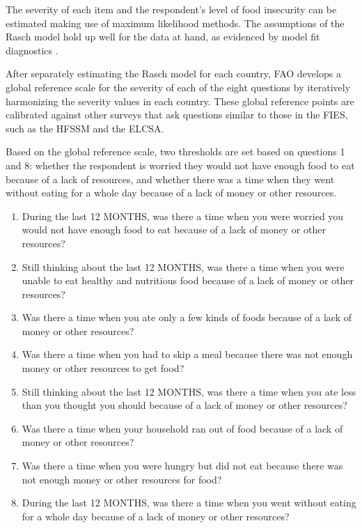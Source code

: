 \documentclass{article}
\begin{document}
The severity of each item and the respondent’s level of food insecurity can be estimated making use of maximum likelihood methods. The assumptions of the Rasch model hold up well for the data at hand, as evidenced by model fit diagnostics \cite{Cafiero2018}.

After separately estimating the Rasch model for each country, FAO develops a global reference scale for the severity of each of the eight questions by iteratively harmonizing the severity values in each country. These global reference points are calibrated against other surveys that ask questions similar to those in the FIES, such as the HFSSM and the ELCSA.

Based on the global reference scale, two thresholds are set based on questions 1 and 8: whether the respondent is worried they would not have enough food to eat because of a lack of resources, and whether there was a time when they went without eating for a whole day because of a lack of money or other resources.


\begin{enumerate}
	\item During the last 12 MONTHS, was there a time when you were worried you would not have enough food to eat because of a lack of money or other resources?
	\item Still thinking about the last 12 MONTHS, was there a time when you were unable to eat healthy and nutritious food because of a lack of money or other resources?
	\item Was there a time when you ate only a few kinds of foods because of a lack of money or other resources?
	\item Was there a time when you had to skip a meal because there was not enough money or other resources to get food?
	\item Still thinking about the last 12 MONTHS, was there a time when you ate less than you thought you should because of a lack of money or other resources?
	\item Was there a time when your household ran out of food because of a lack of money or other resources?
	\item Was there a time when you were hungry but did not eat because there was not enough money or other resources for food?
	\item During the last 12 MONTHS, was there a time when you went without eating for a whole day because of a lack of money or other resources?
  \label{itm:fies}
\end{enumerate}
\end{document}
